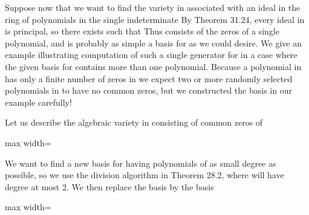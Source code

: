 \documentclass[11pt,oneside]{article}
\begin{document}
\begin{BookBody}
\noindent Suppose now that we want to find the variety  in  associated with an ideal  in  the ring of polynomials in the single indeterminate  By Theorem 31.24, every ideal in  is principal, so there exists  such that  Thus  consists of the zeros of a single polynomial, and  is probably as simple a basis for  as we could desire. We give an example illustrating computation of such a single generator  for  in a case where the given basis for  contains more than one polynomial. Because a polynomial in  has only a finite number of zeros in  we expect two or more randomly selected polynomials in  to have no common zeros, but we constructed the basis in our example carefully!

 Let us describe the algebraic variety  in  consisting of common zeros of

\begin{center}\begin{adjustbox}{max width=\linewidth}\end{adjustbox}\end{center}

\noindent We want to find a new basis for  having polynomials of as small degree as possible, so we use the division algorithm  in Theorem 28.2, where  will have degree at most 2. We then replace the basis  by the basis 

\begin{center}\begin{adjustbox}{max width=\linewidth}\end{adjustbox}\end{center}


\end{BookBody}
\end{document}
